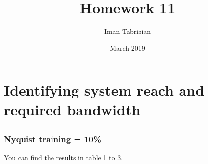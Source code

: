 \documentclass{article}
\title{Homework 11}
\author{Iman Tabrizian}
\date{March 2019}
\begin{document}
\begin{titlepage}
\maketitle
\end{titlepage}

\section{Identifying system reach and required bandwidth}

\subsection{}


\subsubsection{Nyquist training = 10\%}

You can find the results in table 1 to 3.
\end{document}
